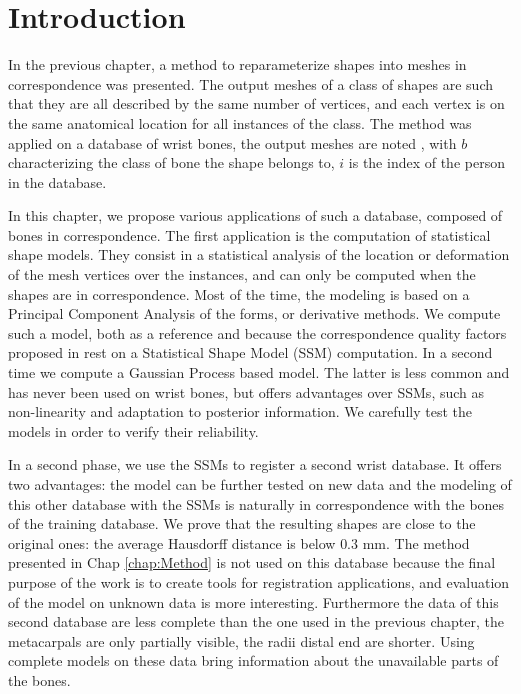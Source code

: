 \section{Introduction}
\label{sec:4_Intro}



In the previous chapter, a method to reparameterize shapes into meshes in correspondence was presented. The output meshes of a class of shapes are such that they are all described by the same number of vertices, and each vertex is on the same anatomical location for all instances of the class. The method was applied on a database of wrist bones, the output meshes are noted \mw*, with $b$ characterizing the class of bone the shape belongs to, $i$ is the index of the person in the database. 

In this chapter, we propose various applications of such a database, composed of bones in correspondence. The first application is the computation of statistical shape models. They consist in a  statistical analysis of the location or deformation of the mesh vertices over the instances, and can only be computed when the shapes are in correspondence. Most of the time, the modeling is based on a Principal Component Analysis of the forms, or derivative methods. We compute such a model, both as a reference and because the correspondence quality factors proposed in \cite{davies_2001_minimum} rest on a Statistical Shape Model (SSM) computation. In a second time we compute a Gaussian Process based model. The latter is less common and has never been used on wrist bones, but offers advantages over SSMs, such as non-linearity and adaptation to posterior information. We carefully test the models in order to verify their reliability. 

In a second phase, we use the SSMs to register a second wrist database. It offers two advantages: the model can be further tested on new data and the modeling of this other database with the SSMs is naturally in correspondence with the bones of the training database. We prove that the resulting shapes are close to the original ones: the average Hausdorff distance is below $0.3$ mm. The method presented in Chap \ref{chap:Method} is not used on this database because the final purpose of the work is to create tools for registration applications, and evaluation of the model on unknown data is more interesting. Furthermore the data of this second database are less complete than the one used in the previous chapter, the metacarpals are only partially visible, the radii distal end are shorter. Using complete models on these data bring information about the unavailable parts of the bones. 


